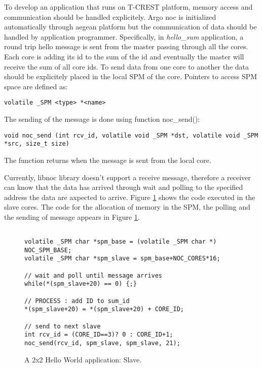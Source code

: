 \documentclass[a4paper,fontsize=10pt,twoside,DIV15,BCOR12mm,headinclude=true,footinclude=false,pagesize,bibtotoc]{scrbook}
\begin{document}
To develop an application that runs on T-CREST platform, memory access and communication should be handled explicitely. Argo noc is initialized automatically through aegean platform but the communication of data should be handled by application programmer. Specifically, in \textit{hello\_sum} application, a round trip hello message is sent from the master passing through all the cores. Each core is adding its id to the sum of the id and eventually the master will receive the sum of all core ids. To send data from one core to another the data should be explicitely placed in the local SPM of the core. Pointers to access SPM space are defined as:

\begin{verbatim}
volatile _SPM <type> *<name>
\end{verbatim}

The sending of the message is done using function noc\_send():

\begin{verbatim}
void noc_send (int rcv_id, volatile void _SPM *dst, volatile void _SPM *src, size_t size)
\end{verbatim}

The function returns when the message is sent from the local core.

Currently, libnoc library doesn't support a receive message, therefore a receiver can know that the data has arrived through wait and polling to the specified address the data are axpected to arrive. Figure \ref{fig:hello_multi} shows the code executed in the slave cores. The code for the allocation of memory in the SPM, the polling and the sending of message appears in Figure \ref{fig:hello_multi}.

\begin{figure}
\begin{verbatim}

volatile _SPM char *spm_base = (volatile _SPM char *) NOC_SPM_BASE;
volatile _SPM char *spm_slave = spm_base+NOC_CORES*16;

// wait and poll until message arrives
while(*(spm_slave+20) == 0) {;}

// PROCESS : add ID to sum_id
*(spm_slave+20) = *(spm_slave+20) + CORE_ID;

// send to next slave
int rcv_id = (CORE_ID==3)? 0 : CORE_ID+1;
noc_send(rcv_id, spm_slave, spm_slave, 21);

\end{verbatim}
\caption{A 2x2 Hello World application: Slave.}
\label{fig:hello_multi}
\end{figure}
\end{document}
